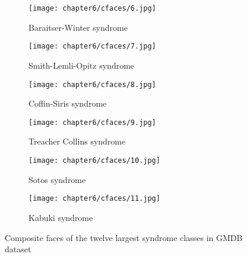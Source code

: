 \documentclass[../report.tex]{subfiles}
\begin{document}
	\begin{figure}[H]\continuedfloat
		\begin{subfigure}[t]{0.45\textwidth}
			\centering
			\texttt{[image: chapter6/cfaces/6.jpg]}
			\caption{Baraitser-Winter syndrome}
		\end{subfigure}
		\begin{subfigure}[t]{0.45\textwidth}
			\centering
			\texttt{[image: chapter6/cfaces/7.jpg]}
			\caption{Smith-Lemli-Opitz syndrome}
		\end{subfigure}
		\begin{subfigure}[t]{0.45\textwidth}
			\centering
			\texttt{[image: chapter6/cfaces/8.jpg]}
			\caption{Coffin-Siris syndrome}
		\end{subfigure}
		\hspace{1.5cm}
		\begin{subfigure}[t]{0.45\textwidth}
			\centering
			\texttt{[image: chapter6/cfaces/9.jpg]}
			\caption{Treacher Collins syndrome}
		\end{subfigure}
			\begin{subfigure}[t]{0.45\textwidth}
		\centering
		\texttt{[image: chapter6/cfaces/10.jpg]}
		\caption{Sotos syndrome}
	\end{subfigure}
	\hspace{1.5cm}
	\begin{subfigure}[t]{0.45\textwidth}
		\centering
		\texttt{[image: chapter6/cfaces/11.jpg]}
		\caption{Kabuki syndrome}
	\end{subfigure}
	\caption{Composite faces of the twelve largest syndrome classes in GMDB dataset}
	\label{fig_comp_gmdb}
\end{figure}
\end{document}
